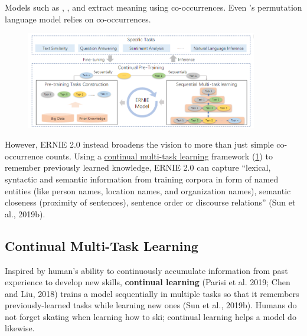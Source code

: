 Models such as , , and  extract meaning using co-occurrences. Even 's permutation language model relies on co-occurrences. 


\begin{figure}[h]
\vspace{-5pt}
\centering
\includegraphics[width=0.9\textwidth]{imgs/ernie2_framework.png}
\vspace{-5pt}
\vspace{-5pt}
\label{fig:ernie2_framework}
\end{figure}


However, ERNIE 2.0 instead broadens the vision to more than just simple co-occurrence counts. Using a \hyperref[sec:ContinualMultiTaskLearning]{continual multi-task learning} framework (\cref{fig:ernie2_framework}) to remember previously learned knowledge, ERNIE 2.0 can capture ``lexical, syntactic and semantic information from training corpora in form of named entities (like person names,
location names, and organization names), semantic closeness (proximity of sentences),
sentence order or discourse relations” (Sun et al., 2019b).

\subsection{Continual Multi-Task Learning}\label{sec:ContinualMultiTaskLearning}

Inspired by human's ability to continuously accumulate information from past experience to develop new skills, \textbf{continual learning} (Parisi et al. 2019; Chen and Liu, 2018) trains a model sequentially in multiple tasks so that it remembers previously-learned tasks while learning new ones (Sun et al., 2019b). Humans do not forget skating when learning how to ski; continual learning helps a model do likewise. 


